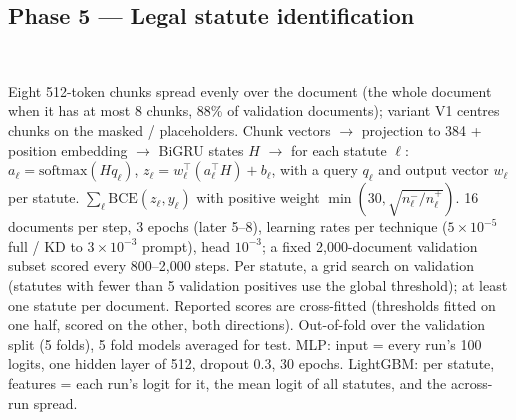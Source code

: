 \subsection{Phase 5 --- Legal statute identification}
\begin{center}\\[2mm]
\end{center}
 Eight 512-token chunks spread evenly over the document (the whole document when it has at most 8
chunks, 88\% of validation documents); variant V1 centres chunks on the masked /
placeholders.
 Chunk vectors $\rightarrow$ projection to 384 + position embedding $\rightarrow$ BiGRU states $H$
$\rightarrow$ for each statute $\ell$: $a_\ell=\mathrm{softmax}(Hq_\ell)$, $z_\ell=w_\ell^\top(a_\ell^\top H)+b_\ell$, with
a query $q_\ell$ and output vector $w_\ell$ per statute.
 $\sum_\ell \mathrm{BCE}(z_\ell,y_\ell)$ with positive weight $\min(30,\sqrt{n^-_\ell/n^+_\ell})$.
 16 documents per step, 3 epochs (later 5--8), learning rates per technique
($5\times10^{-5}$ full / KD to $3\times10^{-3}$ prompt), head $10^{-3}$; a fixed 2,000-document validation subset
scored every 800--2,000 steps.
 Per statute, a grid search on validation (statutes with fewer than 5 validation positives use
the global threshold); at least one statute per document.  Reported scores are cross-fitted (thresholds
fitted on one half, scored on the other, both directions).
 Out-of-fold over the validation split (5 folds), 5 fold models averaged for test.  MLP: input =
every run's 100 logits, one hidden layer of 512, dropout 0.3, 30 epochs.  LightGBM: per statute, features =
each run's logit for it, the mean logit of all statutes, and the across-run spread.
\begin{center}\scriptsize{}\end{center}
